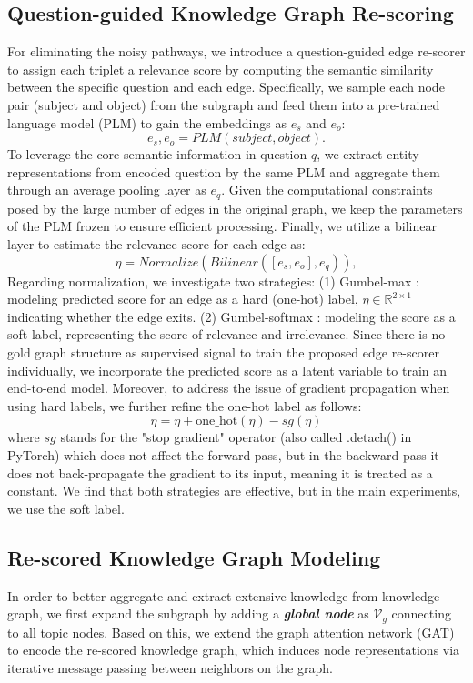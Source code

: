 \documentclass[11pt]{article}
\begin{document}
\subsection{Question-guided Knowledge Graph Re-scoring}
\label{sec:reconstruction}
For eliminating the noisy pathways, we introduce a question-guided edge re-scorer to assign each triplet a relevance score by computing the semantic similarity between the specific question and each edge.
Specifically, we sample each node pair (subject and object) from the subgraph and feed them into a pre-trained language model (PLM) to gain the embeddings as $e_s$ and $ e_o$:
\begin{equation}
    e_s, e_o=PLM(subject,object).
\end{equation}
To leverage the core semantic information in question $q$, we extract entity representations from encoded question by the same PLM and aggregate them through an average pooling layer as $e_q$. 
Given the computational constraints posed by the large number of edges in the original graph, we keep the parameters of the PLM frozen to ensure efficient processing. 
Finally, we utilize a bilinear layer to estimate the relevance score for each edge as: 
\begin{equation}
    \eta = Normalize (Bilinear([e_s, e_o], e_q)),
\end{equation}
Regarding normalization, we investigate two strategies: (1) Gumbel-max \cite{gumbel}: modeling predicted score for an edge as a hard (one-hot) label, $\eta \in \mathbb{R}^{2 \times 1}$ indicating whether the edge exits. (2) Gumbel-softmax \cite{gumbel}: modeling the score as a soft label, representing the score of relevance and irrelevance.
Since there is no gold graph structure as supervised signal to train the proposed edge re-scorer individually, we incorporate the predicted score as a latent variable to train an end-to-end model. Moreover, to address the issue of gradient propagation when using hard labels, we further refine the one-hot label as follows:
\begin{equation}
    \eta = \eta + \mathrm{one\_hot} (\eta) -sg (\eta)
\end{equation}
where $sg$ stands for the "stop gradient" operator (also called .detach() in PyTorch) which does not affect the forward pass, but in the backward pass it does not back-propagate the gradient to its input, meaning it is treated as a constant.
We find that both strategies are effective, but in the main experiments, we use the soft label.

\subsection{Re-scored Knowledge Graph Modeling}
In order to better aggregate and extract extensive knowledge from knowledge graph, we first expand the subgraph by adding a \textbf{\textit{global node}} as $\mathcal{V}_g$ connecting to all topic nodes.
\label{sec:gat}
Based on this, we extend the graph attention network (GAT)~\cite{gat} to encode the re-scored knowledge graph, which induces node representations via iterative message passing between neighbors on the graph. 
\end{document}
